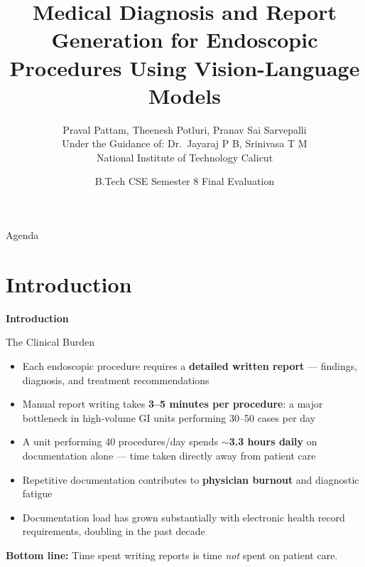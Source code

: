 ﻿\documentclass[aspectratio=169]{beamer}
\title{Medical Diagnosis and Report Generation for Endoscopic Procedures Using Vision-Language Models}
\author{Praval Pattam, Theenesh Potluri, Pranav Sai Sarvepalli \\ \small Under the Guidance of: Dr.\ Jayaraj P B, Srinivasa T M \\ National Institute of Technology Calicut}
\date{B.Tech CSE Semester 8 Final Evaluation}
\newcommand{\scite}[1]{{\footnotesize\color{darkgray}\citet{#1}}}
\begin{document}
\begin{frame}
\titlepage
\end{frame}

\begin{frame}{Agenda}
\tableofcontents
\end{frame}

\section{Introduction}

\begin{frame}
\centering \Large \textbf{Introduction}
\end{frame}

\begin{frame}{The Clinical Burden}
\begin{itemize}
    \item Each endoscopic procedure requires a \textbf{detailed written report} --- findings, diagnosis, and treatment recommendations
    \item Manual report writing takes \textbf{3--5 minutes per procedure}: a major bottleneck in high-volume GI units performing 30--50 cases per day
    \item A unit performing 40 procedures/day spends \textbf{$\sim$3.3 hours daily} on documentation alone --- time taken directly away from patient care
    \item Repetitive documentation contributes to \textbf{physician burnout} and diagnostic fatigue \scite{jama2024burden,bmj2024impact,nat2024burden}
    \item Documentation load has grown substantially with electronic health record requirements, doubling in the past decade \scite{nat2024burden}
\end{itemize}
\vspace{0.5em}
\textbf{Bottom line:} Time spent writing reports is time \textit{not} spent on patient care.
\end{frame}
\end{document}
